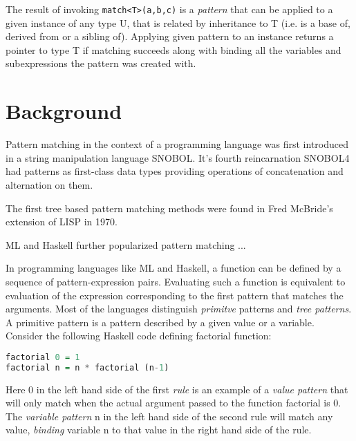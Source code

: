 \documentclass[preprint]{sigplanconf}
\DeclareRobustCommand{\code}[1]{{\lstinline[breaklines=false]{#1}}}
\begin{document}
The result of invoking \code{match<T>(a,b,c)} is a \emph{pattern} that can be applied 
to a given instance of any type U, that is related by inheritance to T (i.e. is 
a base of, derived from or a sibling of). Applying given pattern to an instance 
returns a pointer to type T if matching succeeds along with binding all the 
variables and subexpressions the pattern was created with.

\section{Background} %
\label{sec:bg}

Pattern matching in the context of a programming language was first introduced 
in a string manipulation language SNOBOL\cite{SNOBOL64}. It's fourth 
reincarnation SNOBOL4 had patterns as first-class data types providing 
operations of concatenation and alternation on them\cite{SNOBOL71}.


The first tree based pattern matching methods were found in Fred McBride's 
extension of LISP in 1970.

ML and Haskell further popularized pattern matching ...

In programming languages like ML\cite{ML90} and Haskell\cite{Haskell98Book}, a 
function can be defined by a sequence of pattern-expression pairs. Evaluating 
such a function is equivalent to evaluation of the expression corresponding to 
the first pattern that matches the arguments. Most of the languages distinguish 
\emph{primitve} patterns and \emph{tree patterns}. A primitive pattern is a 
pattern described by a given value or a variable. Consider the following Haskell 
code defining factorial function: 

\begin{lstlisting}[language=Haskell]
factorial 0 = 1
factorial n = n * factorial (n-1)
\end{lstlisting}

Here 0 in the left hand side of the first \emph{rule} is an example of a 
\emph{value pattern} that will only match when the actual argument passed to the 
function factorial is 0. The \emph{variable pattern} n in the left hand side of 
the second rule will match any value, \emph{binding} variable n to that value in 
the right hand side of the rule.
\end{document}
